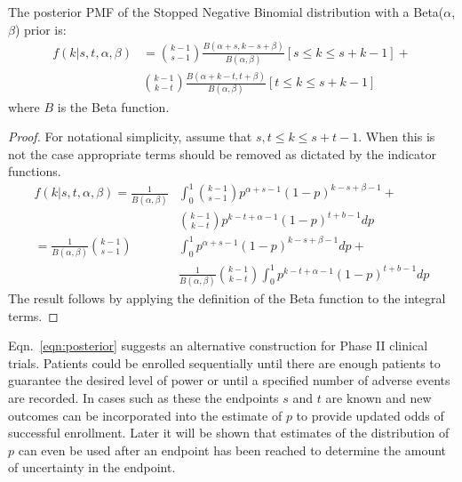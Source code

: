 \documentclass[12pt]{article}         %
\begin{document}

\begin{prop}
The posterior PMF of the Stopped Negative Binomial distribution with a Beta($\alpha$, $\beta$) prior is:
\begin{align} \label{eqn:posterior}
f(k | s, t, \alpha, \beta) &= 
  {k-1 \choose s-1} \frac{B\left(\alpha+s, k-s+\beta \right)}{B(\alpha, \beta)}     [s \leq k \leq s+k-1] + \nonumber \\
  & {k-1 \choose k-t} 
    \frac{B\left(\alpha + k - t, t+\beta\right)}{B(\alpha, \beta)} 
    [t \leq k \leq s+k-1]
\end{align}
where $B$ is the Beta function.
\end{prop}
\begin{proof}
For notational simplicity, assume that $s,t \leq k \leq s+t-1$. When this is not the case appropriate terms should be removed as dictated by the indicator functions.
\begin{align*}
f(k | s, t, \alpha, \beta) = \frac{1}{B(\alpha, \beta)} & \int_0^1 {k-1 \choose s-1} p^{\alpha +s -1} \left(1-p\right)^{k-s+\beta-1} + \\
 & {k-1 \choose k-t} p^{k-t+\alpha-1}\left(1-p\right)^{t+b-1} dp \\
= \frac{1}{B(\alpha, \beta)}  {k-1 \choose s-1} & \int_0^1  p^{\alpha +s -1} \left(1-p\right)^{k-s+\beta-1} dp + \\
 & \frac{1}{B(\alpha, \beta)} {k-1 \choose k-t} \int_0^1  p^{k-t+\alpha-1}\left(1-p\right)^{t+b-1} dp
\end{align*}
The result follows by applying the definition of the Beta function to the integral terms.
\end{proof}

Eqn.~\ref{eqn:posterior} suggests an alternative construction for 
Phase II clinical trials.  Patients could be 
enrolled sequentially until there are enough patients to guarantee the 
desired level of power or until a specified number of adverse events are 
recorded. In cases such as these the endpoints $s$ and $t$ are known and 
new outcomes can be incorporated into the estimate of
$p$ to provide updated odds of successful enrollment. Later it will be shown 
that estimates of the distribution of $p$ can even be used after an endpoint 
has been reached to determine the amount of uncertainty in the endpoint. 
\end{document}
